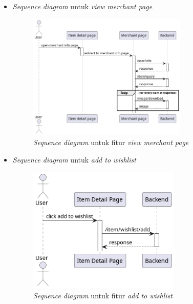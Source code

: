 \documentclass[a4paper]{article}
\begin{document}
\begin{enumerate}
\begin{enumerate}
\begin{itemize}
            \newpage
            \item \textit{Sequence diagram} untuk \textit{view merchant page}
            \begin{figure}[h]
                \centering
                \includegraphics*[height=6cm]{diagram/sequence diagram/FE/11.view merchant page/view merchant page.png}
                \caption{\textit{Sequence diagram} untuk fitur \textit{view merchant page}}
            \end{figure}

            \item \textit{Sequence diagram} untuk \textit{add to wishlist}
            \begin{figure}[h]
                \centering
                \includegraphics*[height=6cm]{diagram/sequence diagram/FE/12. wishlist/add to wishlist/add to wishlist.png}
                \caption{\textit{Sequence diagram} untuk fitur \textit{add to wishlist}}
            \end{figure}


\end{itemize}
\end{enumerate}
\end{enumerate}
\end{document}
